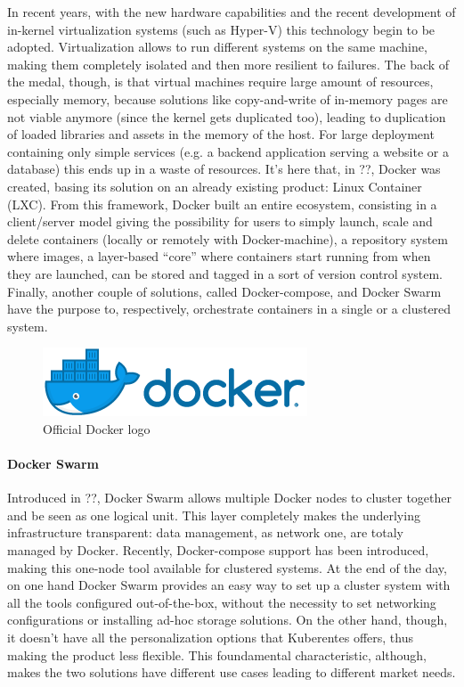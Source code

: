 \documentclass[10pt]{book}
\begin{document}
In recent years, with the new hardware capabilities and the recent development
of in-kernel virtualization systems (such as Hyper-V) this technology
begin to be adopted. Virtualization allows to run different systems on the
same machine, making them completely isolated and then more resilient to
failures. The back of the medal, though, is that virtual machines require large
amount of resources, especially memory, because solutions like copy-and-write
of in-memory pages are not viable anymore (since the kernel gets duplicated
too), leading to duplication of loaded libraries and assets in the memory of
the host.
For large deployment containing only simple services (e.g. a backend
application serving a website or a database) this ends up in a waste of
resources.  It's here that, in ??, Docker was
created, basing its solution on an already existing product: Linux Container
(LXC). From this framework, Docker built an entire ecosystem, consisting in a
client/server model giving the possibility for users to simply launch, scale and
delete containers (locally or remotely with Docker-machine), a repository
system where images, a layer-based ``core'' where containers start running from
when they are launched, can be stored and tagged in a sort of version control
system. Finally, another couple of solutions, called Docker-compose, and Docker
Swarm have the purpose to, respectively, orchestrate containers in a single or
a clustered system.
\begin{figure}[t]
 \centering
 \includegraphics[scale=0.7]{docker_logo}
 \caption{Official Docker logo}
 \label{chap:intro:img:docker_logo}
\end{figure}


\paragraph{Docker Swarm} Introduced in ??, Docker Swarm allows multiple Docker nodes to cluster together and be
seen as one logical unit. This layer completely makes the underlying
infrastructure transparent: data management, as network one, are totaly managed
by Docker. Recently, Docker-compose support has been introduced, making
this one-node tool available for clustered systems. At the end of the day, on
one hand Docker Swarm provides an easy way to set up a cluster system with all
the tools configured out-of-the-box, without the necessity to set networking
configurations or installing ad-hoc storage solutions. On the other hand,
though, it doesn't have all the personalization options that Kuberentes offers,
thus making the product less flexible. This foundamental characteristic,
although, makes the two solutions have different use cases leading to different
market needs. 
\end{document}
